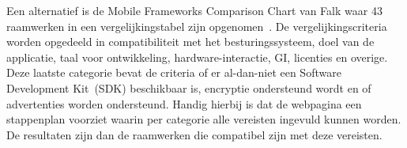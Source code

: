 Een alternatief is de Mobile Frameworks Comparison Chart van Falk waar 43 raamwerken in een vergelijkingstabel zijn opgenomen~\cite{Falk2011}. 
De vergelijkingscriteria worden opgedeeld in compatibiliteit met het besturingssysteem,  doel van de applicatie,  taal voor ontwikkeling,  hardware-interactie,  GI,  licenties en overige.  
Deze laatste categorie bevat de criteria of er al-dan-niet een Software Development Kit~(SDK) beschikbaar is, encryptie ondersteund wordt en of advertenties worden ondersteund.  
Handig hierbij is dat de webpagina een stappenplan voorziet waarin per categorie alle vereisten ingevuld kunnen worden.  
De resultaten zijn dan de raamwerken die compatibel zijn met deze vereisten.

